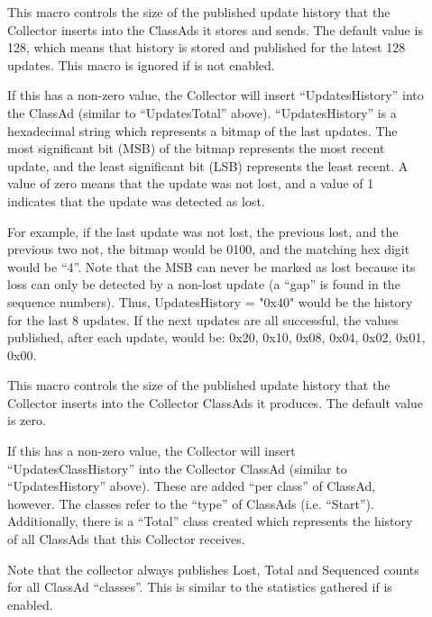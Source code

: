 \begin{description}
\item[]
  \label{param:CollectorDaemonHistorySize} This macro controls the
  size of the published update history that the Collector inserts into
  the ClassAds it stores and sends.  The default value is 128, which
  means that history is stored and published for the latest 128
  updates.  This macro is ignored if 
  is not enabled.

  If this has a non-zero value, the Collector will insert
  ``UpdatesHistory'' into the ClassAd (similar to ``UpdatesTotal''
  above).  ``UpdatesHistory'' is a hexadecimal string which represents
  a bitmap of the last 
  updates.  The most significant bit (MSB) of the bitmap represents the
  most recent update, and the least significant bit (LSB) represents
  the least recent.  A value of zero means that the update was not
  lost, and a value of 1 indicates that the update was detected as
  lost.

  For example, if the last update was not lost, the previous lost, and
  the previous two not, the bitmap would be 0100, and the matching hex
  digit would be ``4''.  Note that the MSB can never be marked as lost
  because its loss can only be detected by a non-lost update (a
  ``gap'' is found in the sequence numbers).  Thus, UpdatesHistory =
  "0x40" would be the history for the last 8 updates.  If the next
  updates are all successful, the values published, after each update,
  would be: 0x20, 0x10, 0x08, 0x04, 0x02, 0x01, 0x00.

\item[]
  \label{param:CollectorClassHistorySize} This macro controls the
  size of the published update history that the Collector inserts into
  the Collector ClassAds it produces.  The default value is zero.

  If this has a non-zero value, the Collector will insert
  ``UpdatesClassHistory'' into the Collector ClassAd (similar to
  ``UpdatesHistory'' above).  These are added ``per class'' of
  ClassAd, however.  The classes refer to the ``type'' of ClassAds
  (i.e. ``Start'').  Additionally, there is a ``Total'' class created
  which represents the history of all ClassAds that this Collector
  receives.

  Note that the collector always publishes Lost, Total and Sequenced
  counts for all ClassAd ``classes''.  This is similar to the
  statistics gathered if  is enabled.


\end{description}
